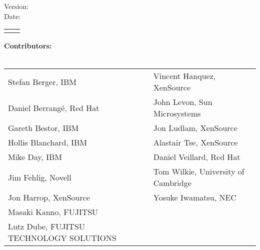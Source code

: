 %
%
%
%

\pagestyle{empty}

\doctitle{} \hfill \revstring{}

\vspace{1cm}

\begin{center}

\vspace{2cm}

\begin{Huge}
  \doctitle{}
\end{Huge}

\vspace{1cm}
\begin{Large}
Version: \revstring{}\\
Date: \datestring{}
\\
\releasestatement{}

\vspace{1cm}
\begin{tabular}{rl}
\docauthors{}
\end{tabular}
\end{Large}
\end{center}
\vspace{.5cm}
\begin{large}
\textbf{Contributors:} \\
\\
\begin{tabular}{p{}l}
Stefan Berger, IBM & Vincent Hanquez, XenSource \\
Daniel Berrang\'e, Red Hat & John Levon, Sun Microsystems \\
Gareth Bestor, IBM & Jon Ludlam, XenSource \\
Hollis Blanchard, IBM & Alastair Tse, XenSource \\
Mike Day, IBM & Daniel Veillard, Red Hat \\
Jim Fehlig, Novell & Tom Wilkie, University of Cambridge \\
Jon Harrop, XenSource & Yosuke Iwamatsu, NEC \\
Masaki Kanno, FUJITSU \\
Lutz Dube, FUJITSU TECHNOLOGY SOLUTIONS \\
\end{tabular}
\end{large}

\vfill

\noindent
\legalnotice{}

\newpage
\pagestyle{fancy}
